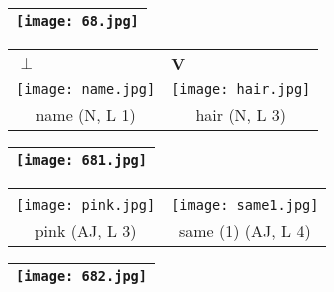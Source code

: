 \documentclass{tufte-book}
\newcommand{\sansnormal}{\sffamily\selectfont}
\begin{document}
\begin{fullwidth}
\begin{table}[h!]
\begin{tabular}{|c|}
\hline
\texttt{[image: 68.jpg]}\\
 
 \hline
\end{tabular}
\label{page:68}
\end{table}

 \begin{table*}[h!]
\begin{tabular}{cc}
 \multicolumn{1}{l}{$\pmb\perp$}&\multicolumn{1}{l}{\sansnormal\textbf{V}} \\
   \texttt{[image: name.jpg]}& \texttt{[image: hair.jpg]}\\
   name (N, L 1) & hair (N, L 3)\\%
 
 
 
\end{tabular}
\end{table*}
\newpage


\begin{table}[h!]
\begin{tabular}{|c|}
\hline
\texttt{[image: 681.jpg]}\\
 
 \hline
\end{tabular}
\label{page:681}
\end{table}

 \begin{table*}[h!]
\begin{tabular}{cc}
 \multicolumn{1}{l}{}&\multicolumn{1}{l}{} \\
   \texttt{[image: pink.jpg]}& \texttt{[image: same1.jpg]}\\
   pink (AJ, L 3) & same (1) (AJ, L 4)\\%
 
 
 
\end{tabular}
\end{table*}

\begin{table}[h!]
\begin{tabular}{|c|}
\hline
\texttt{[image: 682.jpg]}\\
 
 \hline
\end{tabular}
\label{page:682}
\end{table}


\end{fullwidth}
\end{document}
